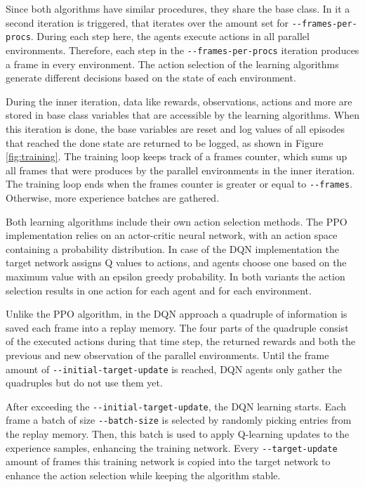 Since both algorithms have similar procedures, they share the base class. In it a second iteration is triggered, that iterates over the amount set for \verb|--frames-per-procs|. During each step here, the agents execute actions in all parallel environments. Therefore, each step in the \verb|--frames-per-procs| iteration produces a frame in every environment. The action selection of the learning algorithms generate different decisions based on the state of each environment.

During the inner iteration, data like rewards, observations, actions and more are stored in base class variables that are accessible by the learning algorithms. When this iteration is done, the base variables are reset and log values of all episodes that reached the done state are returned to be logged, as shown in Figure \ref{fig:training}. The training loop keeps track of a frames counter, which sums up all frames that were produces by the parallel environments in the inner iteration. The training loop ends when the frames counter is greater or equal to \verb|--frames|. Otherwise, more experience batches are gathered.

Both learning algorithms include their own action selection methods. The PPO implementation relies on an actor-critic neural network, with an action space containing a probability distribution. In case of the DQN implementation the target network assigns Q values to actions, and agents choose one based on the maximum value with an epsilon greedy probability. In both variants the action selection results in one action for each agent and for each environment.

Unlike the PPO algorithm, in the DQN approach a quadruple of information is saved each frame into a replay memory. The four parts of the quadruple consist of the executed actions during that time step, the returned rewards and both the previous and new observation of the parallel environments. Until the frame amount of \verb|--initial-target-update| is reached, DQN agents only gather the quadruples but do not use them yet.

After exceeding the \verb|--initial-target-update|, the DQN learning starts. Each frame a batch of size \verb|--batch-size| is selected by randomly picking entries from the replay memory. Then, this batch is used to apply Q-learning updates to the experience samples, enhancing the training network. Every \verb|--target-update| amount of frames this training network is copied into the target network to enhance the action selection while keeping the algorithm stable.

